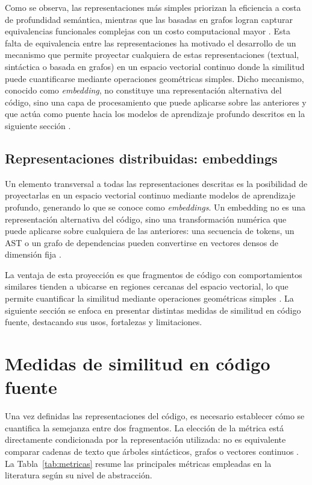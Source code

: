 Como se observa, las representaciones más simples priorizan la eficiencia 
a costa de profundidad semántica, mientras que las basadas en grafos 
logran capturar equivalencias funcionales complejas con un costo 
computacional mayor \cite{Roy2007Survey, Yu2023Graph}. Esta falta de equivalencia entre las representaciones
ha motivado el desarrollo de un mecanismo que permite proyectar 
cualquiera de estas representaciones (textual, sintáctica o basada en 
grafos) en un espacio vectorial continuo donde la similitud puede 
cuantificarse mediante operaciones geométricas simples. Dicho mecanismo, 
conocido como \textit{embedding}, no constituye una representación 
alternativa del código, sino una capa de procesamiento que puede aplicarse 
sobre las anteriores y que actúa como puente hacia los modelos de 
aprendizaje profundo descritos en la siguiente sección 
\cite{Le2021DeepLearning, Alon2018Code2Vec}.

\subsection{Representaciones distribuidas: embeddings}

Un elemento transversal a todas las representaciones descritas es la 
posibilidad de proyectarlas en un espacio vectorial continuo mediante 
modelos de aprendizaje profundo, generando lo que se conoce como 
\textit{embeddings}. Un embedding no es una representación alternativa 
del código, sino una transformación numérica que puede aplicarse sobre 
cualquiera de las anteriores: una secuencia de tokens, un AST o un grafo 
de dependencias pueden convertirse en vectores densos de dimensión fija 
\cite{Le2021DeepLearning, Alon2018Code2Vec}.

La ventaja de esta proyección es que fragmentos de código con 
comportamientos similares tienden a ubicarse en regiones cercanas del 
espacio vectorial, lo que permite cuantificar la similitud mediante 
operaciones geométricas simples
\cite{Alon2018Code2Vec}. La siguiente sección se enfoca en presentar distintas medidas de similitud en código fuente, destacando sus usos, fortalezas y limitaciones.  


\section{Medidas de similitud en código fuente}

Una vez definidas las representaciones del código, es necesario establecer 
cómo se cuantifica la semejanza entre dos fragmentos. La elección de la 
métrica está directamente condicionada por la representación utilizada: 
no es equivalente comparar cadenas de texto que árboles sintácticos, 
grafos o vectores continuos \cite{Roy2007Survey, Lu2026CSSG}. La 
Tabla~\ref{tab:metricas} resume las principales métricas empleadas en 
la literatura según su nivel de abstracción.


